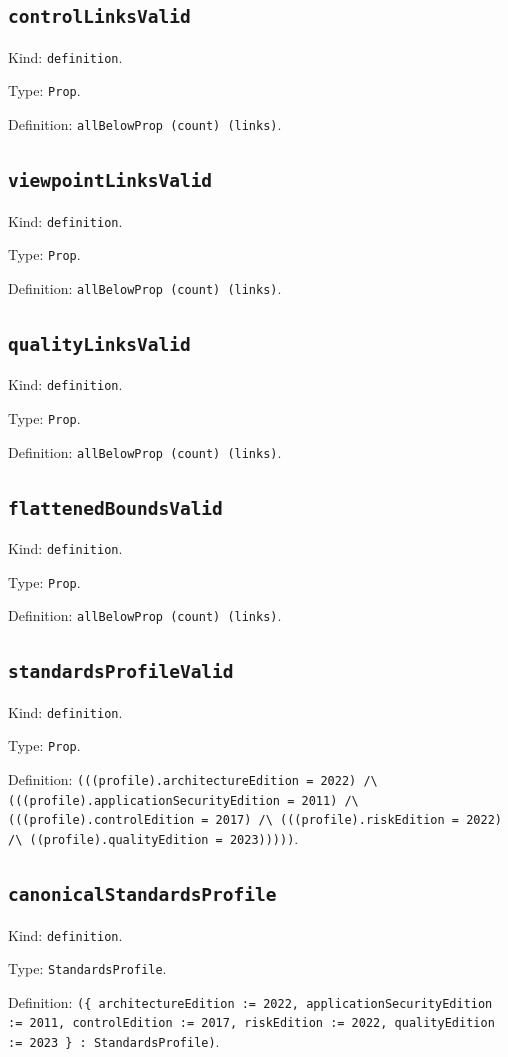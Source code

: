 \documentclass[11pt]{article}
\begin{document}
\subsection*{\texttt{controlLinksValid}}
\noindent Kind: \texttt{definition}.\par
\noindent Type: \texttt{Prop}.\par
\noindent Definition: \texttt{allBelowProp (count) (links)}.\par
\subsection*{\texttt{viewpointLinksValid}}
\noindent Kind: \texttt{definition}.\par
\noindent Type: \texttt{Prop}.\par
\noindent Definition: \texttt{allBelowProp (count) (links)}.\par
\subsection*{\texttt{qualityLinksValid}}
\noindent Kind: \texttt{definition}.\par
\noindent Type: \texttt{Prop}.\par
\noindent Definition: \texttt{allBelowProp (count) (links)}.\par
\subsection*{\texttt{flattenedBoundsValid}}
\noindent Kind: \texttt{definition}.\par
\noindent Type: \texttt{Prop}.\par
\noindent Definition: \texttt{allBelowProp (count) (links)}.\par
\subsection*{\texttt{standardsProfileValid}}
\noindent Kind: \texttt{definition}.\par
\noindent Type: \texttt{Prop}.\par
\noindent Definition: \texttt{(((profile).architectureEdition = 2022) /\textbackslash{} (((profile).applicationSecurityEdition = 2011) /\textbackslash{} (((profile).controlEdition = 2017) /\textbackslash{} (((profile).riskEdition = 2022) /\textbackslash{} ((profile).qualityEdition = 2023)))))}.\par
\subsection*{\texttt{canonicalStandardsProfile}}
\noindent Kind: \texttt{definition}.\par
\noindent Type: \texttt{StandardsProfile}.\par
\noindent Definition: \texttt{(\{ architectureEdition := 2022, applicationSecurityEdition := 2011, controlEdition := 2017, riskEdition := 2022, qualityEdition := 2023 \} : StandardsProfile)}.\par
\end{document}
